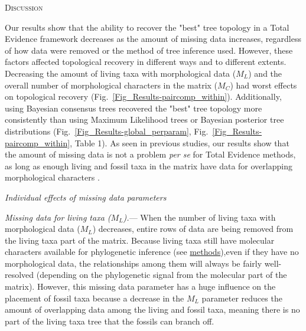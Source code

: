\documentclass[12pt,letterpaper]{article}
\renewcommand{\section}[1]{%
\bigskip
\begin{center}
\begin{Large}
\normalfont\scshape #1
\medskip
\end{Large}
\end{center}}
\renewcommand{\subsection}[1]{%
\bigskip
\begin{center}
\begin{large}
\normalfont\itshape #1
\end{large}
\end{center}}
\renewcommand{\subsubsection}[1]{%
\vspace{2ex}
\noindent
\textit{#1.}---}
\begin{document}
%
%

\section{Discussion}

Our results show that the ability to recover the "best" tree topology in a Total Evidence framework decreases as the amount of missing data increases, regardless of how data were removed or the method of tree inference used. However, these factors affected topological recovery in different ways and to different extents. 
Decreasing the amount of living taxa with morphological data ($M_{L}$) and the overall number of morphological characters in the matrix ($M_{C}$) had worst effects on topological recovery (Fig.~\ref{Fig_Results-paircomp_within}). Additionally, using Bayesian consensus trees recovered the "best" tree topology more consistently than using Maximum Likelihood trees or Bayesian posterior tree distributions (Fig.~\ref{Fig_Results-global_perparam}, Fig.~\ref{Fig_Results-paircomp_within}, Table 1). As seen in previous studies, our results show that the amount of missing data is not a problem \textit{per se} for Total Evidence methods, as long as enough living and fossil taxa in the matrix have data for overlapping morphological characters \citep[e.g.][]{kearneyfragmentary2002,wiensmissing2003,rouresite-specific2011,pattinsonphylogeny2014}. 

\subsection{Individual effects of missing data parameters}
\subsubsection{Missing data for living taxa ($M_{L}$)}
When the number of living taxa with morphological data ($M_{L}$) decreases, entire rows of data are being removed from the living taxa part of the matrix. Because living taxa still have molecular characters available for phylogenetic inference (see \hyperref[Generating_the_matrix]{methods}),even if they have no morphological data, the relationships among them will always be fairly well-resolved (depending on the phylogenetic signal from the molecular part of the matrix).  However, this missing data parameter has a huge influence on the placement of fossil taxa because a decrease in the $M_{L}$ parameter reduces the amount of overlapping data among the living and fossil taxa, meaning there is no part of the living taxa tree that the fossils can branch off.
\end{document}
